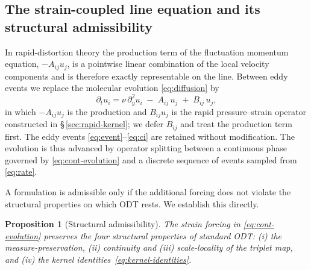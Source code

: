 \documentclass[lineno]{JFM-FLM_Au}
\newtheorem{proposition}{Proposition}
\begin{document}
\subsection{The strain-coupled line equation and its structural
admissibility}\label{sec:strain-forcing}

In rapid-distortion theory the production term of the fluctuation momentum
equation, $-A_{ij}u_j$, is a pointwise linear combination of the local
velocity components and is therefore exactly representable on the line.
Between eddy events we replace the molecular evolution
\eqref{eq:diffusion} by
\begin{equation}
  \partial_t u_i
  = \nu\,\partial_y^2 u_i \;-\; A_{ij}\,u_j \;+\; B_{ij}\,u_j,
  \label{eq:cont-evolution}
\end{equation}
in which $-A_{ij}u_j$ is the production and $B_{ij}u_j$ is the rapid
pressure--strain operator constructed in \S\,\ref{sec:rapid-kernel}; we
defer $B_{ij}$ and treat the production term first. The eddy events
\eqref{eq:event}--\eqref{eq:ci} are retained without modification. The
evolution is thus advanced by operator splitting between a continuous phase
governed by \eqref{eq:cont-evolution} and a discrete sequence of events
sampled from \eqref{eq:rate}.

A formulation is admissible only if the additional forcing does not
violate the structural properties on which ODT rests. We establish this
directly.

\begin{proposition}[Structural admissibility]\label{prop:admissibility}
The strain forcing in \eqref{eq:cont-evolution} preserves the four
structural properties of standard ODT: \emph{(i)} the measure-preservation,
\emph{(ii)} continuity and \emph{(iii)} scale-locality of the triplet map,
and \emph{(iv)} the kernel identities~\eqref{eq:kernel-identities}.
\end{proposition}
\end{document}
